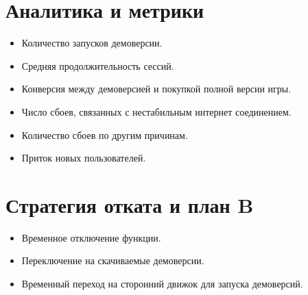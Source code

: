 \documentclass[12pt, a4paper]{article}
\begin{document}
\section{Аналитика и метрики}
\begin{itemize}
	\item Количество запусков демоверсии.
	\item Средняя продолжительность сессий.
	\item Конверсия между демоверсией и покупкой
	полной версии игры.
	\item Число сбоев, связанных с нестабильным 
	интернет соединением.
	\item Количество сбоев по другим причинам.
	\item Приток новых пользователей.
\end{itemize}
\newpage

\section{Стратегия отката и план B}
\begin{itemize}
	\item Временное отключение функции.
	\item Переключение на скачиваемые демоверсии.
	\item Временный переход на сторонний движок
	для запуска демоверсий.
\end{itemize}
\end{document}
